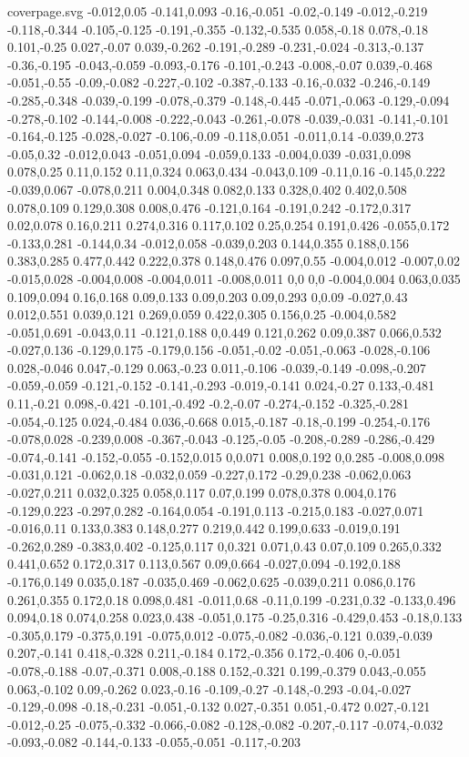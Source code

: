 \begin{filecontents}[noheader]{coverpage.svg}
-0.012,0.05 -0.141,0.093 -0.16,-0.051 -0.02,-0.149 -0.012,-0.219 -0.118,-0.344 -0.105,-0.125 -0.191,-0.355 -0.132,-0.535 0.058,-0.18 0.078,-0.18 0.101,-0.25 0.027,-0.07 0.039,-0.262 -0.191,-0.289 -0.231,-0.024 -0.313,-0.137 -0.36,-0.195 -0.043,-0.059 -0.093,-0.176 -0.101,-0.243 -0.008,-0.07 0.039,-0.468 -0.051,-0.55 -0.09,-0.082 -0.227,-0.102 -0.387,-0.133 -0.16,-0.032 -0.246,-0.149 -0.285,-0.348 -0.039,-0.199 -0.078,-0.379 -0.148,-0.445 -0.071,-0.063 -0.129,-0.094 -0.278,-0.102 -0.144,-0.008 -0.222,-0.043 -0.261,-0.078 -0.039,-0.031 -0.141,-0.101 -0.164,-0.125 -0.028,-0.027 -0.106,-0.09 -0.118,0.051 -0.011,0.14 -0.039,0.273 -0.05,0.32 -0.012,0.043 -0.051,0.094 -0.059,0.133 -0.004,0.039 -0.031,0.098 0.078,0.25 0.11,0.152 0.11,0.324 0.063,0.434 -0.043,0.109 -0.11,0.16 -0.145,0.222 -0.039,0.067 -0.078,0.211 0.004,0.348 0.082,0.133 0.328,0.402 0.402,0.508 0.078,0.109 0.129,0.308 0.008,0.476 -0.121,0.164 -0.191,0.242 -0.172,0.317 0.02,0.078 0.16,0.211 0.274,0.316 0.117,0.102 0.25,0.254 0.191,0.426 -0.055,0.172 -0.133,0.281 -0.144,0.34 -0.012,0.058 -0.039,0.203 0.144,0.355 0.188,0.156 0.383,0.285 0.477,0.442 0.222,0.378 0.148,0.476 0.097,0.55 -0.004,0.012 -0.007,0.02 -0.015,0.028 -0.004,0.008 -0.004,0.011 -0.008,0.011 0,0 0,0 -0.004,0.004 0.063,0.035 0.109,0.094 0.16,0.168 0.09,0.133 0.09,0.203 0.09,0.293 0,0.09 -0.027,0.43 0.012,0.551 0.039,0.121 0.269,0.059 0.422,0.305 0.156,0.25 -0.004,0.582 -0.051,0.691 -0.043,0.11 -0.121,0.188 0,0.449 0.121,0.262 0.09,0.387 0.066,0.532 -0.027,0.136 -0.129,0.175 -0.179,0.156 -0.051,-0.02 -0.051,-0.063 -0.028,-0.106 0.028,-0.046 0.047,-0.129 0.063,-0.23 0.011,-0.106 -0.039,-0.149 -0.098,-0.207 -0.059,-0.059 -0.121,-0.152 -0.141,-0.293 -0.019,-0.141 0.024,-0.27 0.133,-0.481 0.11,-0.21 0.098,-0.421 -0.101,-0.492 -0.2,-0.07 -0.274,-0.152 -0.325,-0.281 -0.054,-0.125 0.024,-0.484 0.036,-0.668 0.015,-0.187 -0.18,-0.199 -0.254,-0.176 -0.078,0.028 -0.239,0.008 -0.367,-0.043 -0.125,-0.05 -0.208,-0.289 -0.286,-0.429 -0.074,-0.141 -0.152,-0.055 -0.152,0.015 0,0.071 0.008,0.192 0,0.285 -0.008,0.098 -0.031,0.121 -0.062,0.18 -0.032,0.059 -0.227,0.172 -0.29,0.238 -0.062,0.063 -0.027,0.211 0.032,0.325 0.058,0.117 0.07,0.199 0.078,0.378 0.004,0.176 -0.129,0.223 -0.297,0.282 -0.164,0.054 -0.191,0.113 -0.215,0.183 -0.027,0.071 -0.016,0.11 0.133,0.383 0.148,0.277 0.219,0.442 0.199,0.633 -0.019,0.191 -0.262,0.289 -0.383,0.402 -0.125,0.117 0,0.321 0.071,0.43 0.07,0.109 0.265,0.332 0.441,0.652 0.172,0.317 0.113,0.567 0.09,0.664 -0.027,0.094 -0.192,0.188 -0.176,0.149 0.035,0.187 -0.035,0.469 -0.062,0.625 -0.039,0.211 0.086,0.176 0.261,0.355 0.172,0.18 0.098,0.481 -0.011,0.68 -0.11,0.199 -0.231,0.32 -0.133,0.496 0.094,0.18 0.074,0.258 0.023,0.438 -0.051,0.175 -0.25,0.316 -0.429,0.453 -0.18,0.133 -0.305,0.179 -0.375,0.191 -0.075,0.012 -0.075,-0.082 -0.036,-0.121 0.039,-0.039 0.207,-0.141 0.418,-0.328 0.211,-0.184 0.172,-0.356 0.172,-0.406 0,-0.051 -0.078,-0.188 -0.07,-0.371 0.008,-0.188 0.152,-0.321 0.199,-0.379 0.043,-0.055 0.063,-0.102 0.09,-0.262 0.023,-0.16 -0.109,-0.27 -0.148,-0.293 -0.04,-0.027 -0.129,-0.098 -0.18,-0.231 -0.051,-0.132 0.027,-0.351 0.051,-0.472 0.027,-0.121 -0.012,-0.25 -0.075,-0.332 -0.066,-0.082 -0.128,-0.082 -0.207,-0.117 -0.074,-0.032 -0.093,-0.082 -0.144,-0.133 -0.055,-0.051 -0.117,-0.203 
\end{filecontents}
